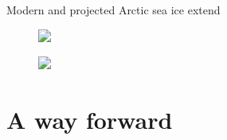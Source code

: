 \documentclass[hide notes,intlimits]{beamer}
\begin{document}
\begin{frame}{Modern and projected Arctic sea ice extend}
  \vspace{-1em}
  \begin{minipage}[t][1.25cm][t]{\textwidth}
    \begin{figure}
      \includegraphics<1->[width=1cm]{brain_solution}
    \end{figure}
  \end{minipage}
  \vspace{0.25em}
  \begin{minipage}[t][6.75cm][b]{\textwidth}
    \begin{figure}
      \includegraphics<2>[height=5.5cm]{CCS108_Fig2.6}
    \end{figure}
  \end{minipage}
\end{frame}


  {
}


\part{A way forward}

\frame{\partpage}

  {
}
\end{document}
